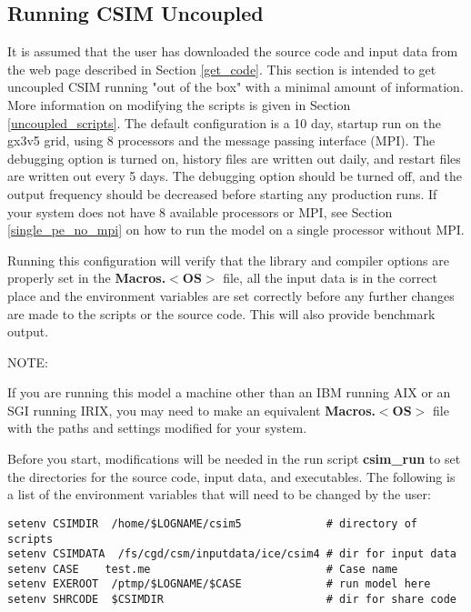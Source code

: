 
\subsection{Running CSIM Uncoupled}

It is assumed that the user has downloaded the source code and input data
from the web page described in Section \ref{get_code}.  This section is
intended to get uncoupled CSIM running "out of the box" with a minimal
amount of information. More information on modifying the scripts is given
in Section \ref{uncoupled_scripts}.  The default configuration is a 10 day, startup
run on the gx3v5 grid, using 8 processors and the message passing interface (MPI).
The debugging option is turned on, history files are written out daily, and
restart files are written out every 5 days.  The debugging option should be
turned off, and the output frequency should be decreased before starting
any production runs.  If your system does not have 8 available processors or MPI,
see Section \ref{single_pe_no_mpi} on how to run the model on a single processor
without MPI.

Running this configuration will verify that the library and compiler options
are properly set in the {\bf Macros.$<$OS$>$} file, all the input data is in the correct
place and the environment variables are set correctly before any further
changes are made to the scripts or the source code. This will also provide
benchmark output.

\begin{Ventry}{NOTE:}
\item[NOTE]

If you are running this model a machine other than an IBM running AIX or an
SGI running IRIX, you may need to make an equivalent {\bf Macros.$<$OS$>$}
file with the paths and settings modified for your system.
\end{Ventry}

Before you start, modifications will be needed in the run script {\bf csim\_run}
to set the directories for the source code, input data, and executables.  The
following is a list of the environment variables that will need to be changed
by the user: 

\begin{verbatim}
setenv CSIMDIR  /home/$LOGNAME/csim5             # directory of scripts
setenv CSIMDATA  /fs/cgd/csm/inputdata/ice/csim4 # dir for input data
setenv CASE    test.me                           # Case name
setenv EXEROOT  /ptmp/$LOGNAME/$CASE             # run model here
setenv SHRCODE  $CSIMDIR                         # dir for share code
\end{verbatim}

